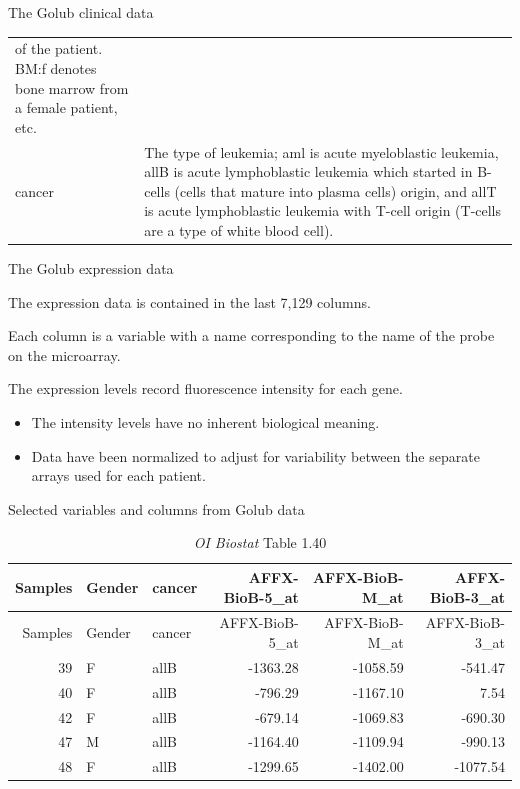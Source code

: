\documentclass[
  ignorenonframetext,
]{beamer}
\begin{document}
\begin{frame}{The Golub clinical data}
\begin{longtable}[]{@{}ll@{}}
\begin{minipage}[t]{0.82\columnwidth}
of the patient. BM:f denotes bone marrow from a female patient,
etc.\strut
\end{minipage}\tabularnewline
\begin{minipage}[t]{0.12\columnwidth}\raggedright
cancer\strut
\end{minipage} & \begin{minipage}[t]{0.82\columnwidth}\raggedright
The type of leukemia; aml is acute myeloblastic leukemia, allB is acute
lymphoblastic leukemia which started in B-cells (cells that mature into
plasma cells) origin, and allT is acute lymphoblastic leukemia with
T-cell origin (T-cells are a type of white blood cell).\strut
\end{minipage}\tabularnewline
\bottomrule
\end{longtable}

\end{frame}

\begin{frame}{The Golub expression data}
\protect\hypertarget{the-golub-expression-data}{}

The expression data is contained in the last 7,129 columns.

Each column is a variable with a name corresponding to the name of the
probe on the microarray.

The expression levels record fluorescence intensity for each gene.

\begin{itemize}
\item
  The intensity levels have no inherent biological meaning.
\item
  Data have been normalized to adjust for variability between the
  separate arrays used for each patient.
\end{itemize}

\end{frame}

\begin{frame}{Selected variables and columns from Golub data}
\protect\hypertarget{selected-variables-and-columns-from-golub-data}{}

\captionsetup[table]{labelformat=empty}
\scriptsize

\scriptsize

\begin{longtable}[]{@{}rllrrr@{}}
\caption{\emph{OI Biostat} Table 1.40}\tabularnewline
\toprule
Samples & Gender & cancer & AFFX-BioB-5\_at & AFFX-BioB-M\_at &
AFFX-BioB-3\_at\tabularnewline
\midrule
\endfirsthead
\toprule
Samples & Gender & cancer & AFFX-BioB-5\_at & AFFX-BioB-M\_at &
AFFX-BioB-3\_at\tabularnewline
\midrule
\endhead
39 & F & allB & -1363.28 & -1058.59 & -541.47\tabularnewline
40 & F & allB & -796.29 & -1167.10 & 7.54\tabularnewline
42 & F & allB & -679.14 & -1069.83 & -690.30\tabularnewline
47 & M & allB & -1164.40 & -1109.94 & -990.13\tabularnewline
48 & F & allB & -1299.65 & -1402.00 & -1077.54\tabularnewline
\bottomrule
\end{longtable}

\normalsize

\end{frame}
\end{document}

